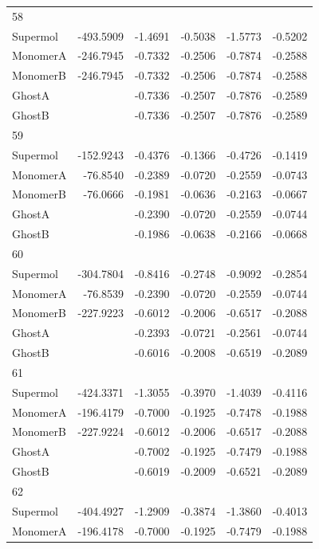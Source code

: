\documentclass[journal=jctcce,manuscript=article]{achemso}
\begin{document}
\begin{spacing}{1}
\begin{longtable}{lRRRRR}
    58 &  &  &  &  &  \\
    Supermol & -493.5909 & -1.4691 & -0.5038 & -1.5773 & -0.5202 \\
    MonomerA & -246.7945 & -0.7332 & -0.2506 & -0.7874 & -0.2588 \\
    MonomerB & -246.7945 & -0.7332 & -0.2506 & -0.7874 & -0.2588 \\
    GhostA &  & -0.7336 & -0.2507 & -0.7876 & -0.2589 \\
    GhostB &  & -0.7336 & -0.2507 & -0.7876 & -0.2589 \\
    59 &  &  &  &  &  \\
    Supermol & -152.9243 & -0.4376 & -0.1366 & -0.4726 & -0.1419 \\
    MonomerA & -76.8540 & -0.2389 & -0.0720 & -0.2559 & -0.0743 \\
    MonomerB & -76.0666 & -0.1981 & -0.0636 & -0.2163 & -0.0667 \\
    GhostA &  & -0.2390 & -0.0720 & -0.2559 & -0.0744 \\
    GhostB &  & -0.1986 & -0.0638 & -0.2166 & -0.0668 \\
    60 &  &  &  &  &  \\
    Supermol & -304.7804 & -0.8416 & -0.2748 & -0.9092 & -0.2854 \\
    MonomerA & -76.8539 & -0.2390 & -0.0720 & -0.2559 & -0.0744 \\
    MonomerB & -227.9223 & -0.6012 & -0.2006 & -0.6517 & -0.2088 \\
    GhostA &  & -0.2393 & -0.0721 & -0.2561 & -0.0744 \\
    GhostB &  & -0.6016 & -0.2008 & -0.6519 & -0.2089 \\
    61 &  &  &  &  &  \\
    Supermol & -424.3371 & -1.3055 & -0.3970 & -1.4039 & -0.4116 \\
    MonomerA & -196.4179 & -0.7000 & -0.1925 & -0.7478 & -0.1988 \\
    MonomerB & -227.9224 & -0.6012 & -0.2006 & -0.6517 & -0.2088 \\
    GhostA &  & -0.7002 & -0.1925 & -0.7479 & -0.1988 \\
    GhostB &  & -0.6019 & -0.2009 & -0.6521 & -0.2089 \\
    62 &  &  &  &  &  \\
    Supermol & -404.4927 & -1.2909 & -0.3874 & -1.3860 & -0.4013 \\
    MonomerA & -196.4178 & -0.7000 & -0.1925 & -0.7479 & -0.1988 \\

\end{longtable}
\end{spacing}
\end{document}
